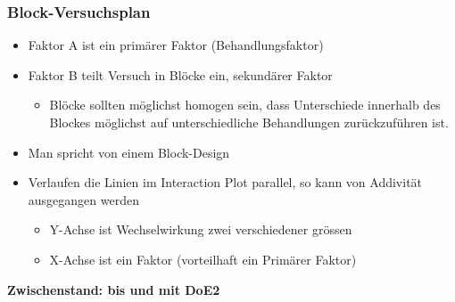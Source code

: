 \subsubsection{Block-Versuchsplan}
\begin{itemize}
	\item Faktor A ist ein primärer Faktor (Behandlungsfaktor)
	\item Faktor B teilt Versuch in Blöcke ein, sekundärer Faktor
	\begin{itemize}
		\item Blöcke sollten möglichst homogen sein, dass Unterschiede innerhalb des Blockes möglichst auf unterschiedliche Behandlungen zurückzuführen ist. 
	\end{itemize}
	\item Man spricht von einem Block-Design
	\item Verlaufen die Linien im Interaction Plot parallel, so kann von Addivität ausgegangen werden
	\begin{itemize}
		\item Y-Achse ist Wechselwirkung zwei verschiedener grössen
		\item X-Achse ist ein Faktor (vorteilhaft ein Primärer Faktor)
	\end{itemize}
\end{itemize}

\textbf{Zwischenstand: bis und mit DoE2}
